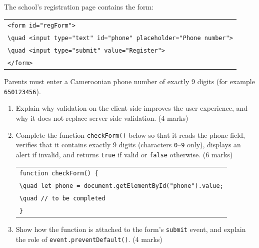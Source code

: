 \documentclass[11pt]{article}
\begin{document}
\begin{exercice}
The school's registration page contains the form:
\begin{center}
\begin{tabular}{l}
\texttt{<form id="regForm">}\\
\texttt{\textbackslash{}quad <input type="text" id="phone" placeholder="Phone number">}\\
\texttt{\textbackslash{}quad <input type="submit" value="Register">}\\
\texttt{</form>}
\end{tabular}
\end{center}
Parents must enter a Cameroonian phone number of exactly 9 digits (for example \texttt{650123456}).
\begin{enumerate}
\item Explain why validation on the client side improves the user experience, and why it does not replace server-side validation. \hfill(4 marks)
\item Complete the function \texttt{checkForm()} below so that it reads the phone field, verifies that it contains exactly 9 digits (characters \texttt{0}--\texttt{9} only), displays an alert if invalid, and returns \texttt{true} if valid or \texttt{false} otherwise. \hfill(6 marks)
\begin{center}
\begin{tabular}{l}
\texttt{function checkForm() \{}\\
\texttt{\textbackslash{}quad let phone = document.getElementById("phone").value;}\\
\texttt{\textbackslash{}quad // to be completed}\\
\texttt{\}}
\end{tabular}
\end{center}
\item Show how the function is attached to the form's \texttt{submit} event, and explain the role of \texttt{event.preventDefault()}. \hfill(4 marks)
\end{enumerate}
\end{exercice}
\end{document}
